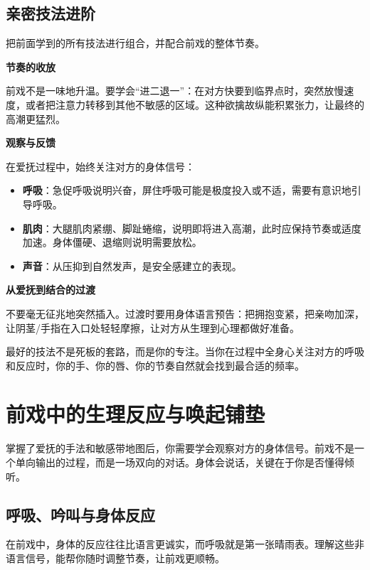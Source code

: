 \documentclass[12pt,UTF8]{ctexbook}
\begin{document}
\section{亲密技法进阶}

把前面学到的所有技法进行组合，并配合前戏的整体节奏。

\textbf{节奏的收放}

前戏不是一味地升温。要学会“进二退一”：在对方快要到临界点时，突然放慢速度，或者把注意力转移到其他不敏感的区域。这种欲擒故纵能积累张力，让最终的高潮更猛烈。

\textbf{观察与反馈}

在爱抚过程中，始终关注对方的身体信号：

\begin{itemize}
\item \textbf{呼吸}：急促呼吸说明兴奋，屏住呼吸可能是极度投入或不适，需要有意识地引导呼吸。
\item \textbf{肌肉}：大腿肌肉紧绷、脚趾蜷缩，说明即将进入高潮，此时应保持节奏或适度加速。身体僵硬、退缩则说明需要放松。
\item \textbf{声音}：从压抑到自然发声，是安全感建立的表现。
\end{itemize}

\textbf{从爱抚到结合的过渡}

不要毫无征兆地突然插入。过渡时要用身体语言预告：把拥抱变紧，把亲吻加深，让阴茎/手指在入口处轻轻摩擦，让对方从生理到心理都做好准备。

\begin{tcolorbox}[colback=pink!5!white,colframe=red!50!black,title=贴心小叮咛]
最好的技法不是死板的套路，而是你的专注。当你在过程中全身心关注对方的呼吸和反应时，你的手、你的唇、你的节奏自然就会找到最合适的频率。
\end{tcolorbox}

\chapter{前戏中的生理反应与唤起铺垫}

掌握了爱抚的手法和敏感带地图后，你需要学会观察对方的身体信号。前戏不是一个单向输出的过程，而是一场双向的对话。身体会说话，关键在于你是否懂得倾听。

\section{呼吸、吟叫与身体反应}

在前戏中，身体的反应往往比语言更诚实，而呼吸就是第一张晴雨表。理解这些非语言信号，能帮你随时调整节奏，让前戏更顺畅。
\end{document}
